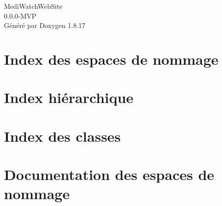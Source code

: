\let\mypdfximage\pdfximage\def\pdfximage{\immediate\mypdfximage}\documentclass[twoside]{book}
\newcommand{\+}{\discretionary{\mbox{\scriptsize$\hookleftarrow$}}{}{}}
\newcommand{\clearemptydoublepage}{%
  \newpage{\pagestyle{empty}\cleardoublepage}%
}
\begin{document}
\hypersetup{pageanchor=false,
             bookmarksnumbered=true,
             pdfencoding=unicode
            }
\begin{titlepage}
\vspace*{7cm}
\begin{center}%
{\Large Medi\+Watch\+Web\+Site \\[1ex]\large 0.\+0.\+0-\/M\+VP }\\
\vspace*{1cm}
{\large Généré par Doxygen 1.8.17}\\
\end{center}
\end{titlepage}
\clearemptydoublepage
{}
\tableofcontents
\clearemptydoublepage
{}
\hypersetup{pageanchor=true}

\chapter{Index des espaces de nommage}

\chapter{Index hiérarchique}

\chapter{Index des classes}

\chapter{Documentation des espaces de nommage}















\end{document}
